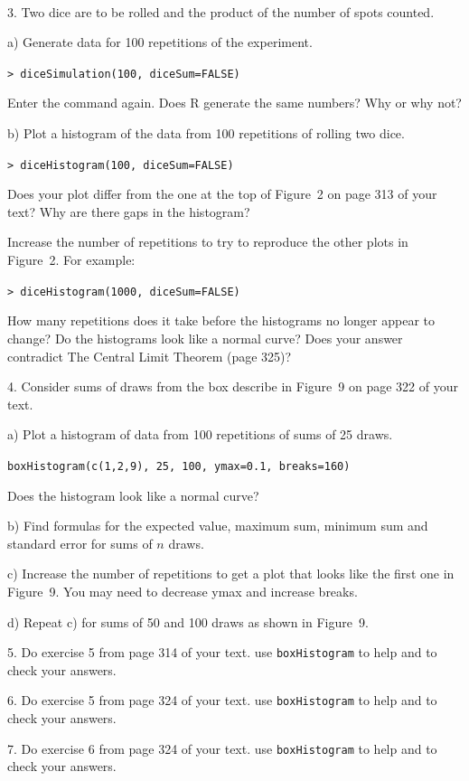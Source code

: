 \documentclass[10pt]{article}
\begin{document}
\vfill
\eject          
{\ }

3. Two dice are to be rolled and the product of the number of spots counted.  

\hspace{20pt} a) Generate data for 100 repetitions of the experiment.

\HH \lstinline!> diceSimulation(100, diceSum=FALSE)!

Enter the command again.  Does R generate the same numbers? Why or why not?

\hspace{20pt} b) Plot a histogram of the data from 100 repetitions of rolling two dice.

\HH \lstinline!> diceHistogram(100, diceSum=FALSE)!

Does your plot differ from the one at the top of Figure~2 on page 313 of your text? 
Why are there gaps in the histogram?

 Increase the
number of repetitions to try to reproduce the other plots in Figure~2.  For example:

\HH \lstinline!> diceHistogram(1000, diceSum=FALSE)!

How many repetitions does it take before the histograms no longer appear to change?
Do the histograms look like a normal curve?  Does your answer contradict The 
Central Limit 
Theorem (page 325)?
\vspace{.5in}

4. Consider sums of draws from the box describe in Figure~9 on page 322 of your text.

\hspace{20pt} a) Plot a histogram of data from 100 repetitions of sums of 25 draws.

\HH \lstinline!boxHistogram(c(1,2,9), 25, 100, ymax=0.1, breaks=160)!

Does the histogram look like  a normal curve?

\hspace{20pt} b) Find formulas for the expected value, maximum sum, minimum sum and
standard error for sums of $n$ draws.

\hspace{20pt} c)  Increase the number of repetitions to get a plot that looks like the 
first one in Figure~9.  You may need to decrease ymax and increase breaks.

\hspace{20pt} d)  Repeat c) for sums of 50 and 100 draws as shown in Figure~9.
\medskip

5. Do exercise 5 from page 314 of your text.  use \lstinline!boxHistogram! to help and to 
check your answers.
\medskip

6. Do exercise 5 from page 324 of your text.  use \lstinline!boxHistogram! to help and to 
check your answers.
\medskip

7. Do exercise 6 from page 324 of your text.  use \lstinline!boxHistogram! to help and to 
check your answers.
\end{document}

